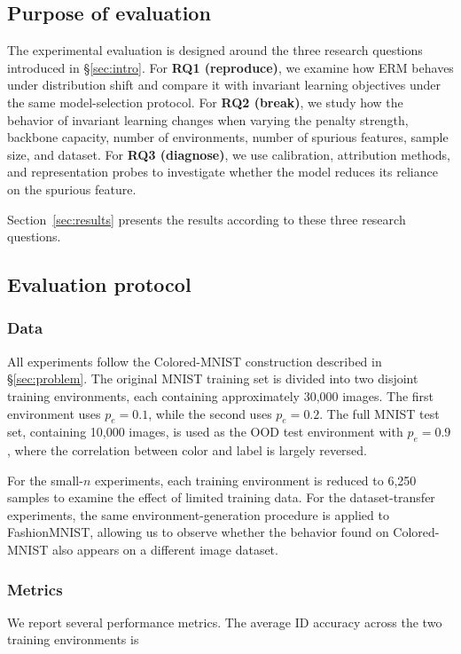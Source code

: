 \documentclass[12pt,a4paper]{article}
\begin{document}
\subsection{Purpose of evaluation}\label{subsec:purpose}

The experimental evaluation is designed around the three research questions introduced
in \S\ref{sec:intro}. For \textbf{RQ1 (reproduce)}, we examine how ERM behaves under
distribution shift and compare it with invariant learning objectives under the same
model-selection protocol. For \textbf{RQ2 (break)}, we study how the behavior of
invariant learning changes when varying the penalty strength, backbone capacity, number
of environments, number of spurious features, sample size, and dataset. For
\textbf{RQ3 (diagnose)}, we use calibration, attribution methods, and representation
probes to investigate whether the model reduces its reliance on the spurious feature.

Section~\ref{sec:results} presents the results according to these three research questions.

\subsection{Evaluation protocol}
\label{subsec:protocol}

\subsubsection{Data}
All experiments follow the Colored-MNIST construction described in
\S\ref{sec:problem}. The original MNIST training set is divided into two disjoint
training environments, each containing approximately 30,000 images. The first
environment uses $p_e=0.1$, while the second uses $p_e=0.2$. The full MNIST test set,
containing 10,000 images, is used as the OOD test environment with $p_e=0.9$, where
the correlation between color and label is largely reversed.

For the small-$n$ experiments, each training environment is reduced to 6,250 samples
to examine the effect of limited training data. For the dataset-transfer experiments,
the same environment-generation procedure is applied to FashionMNIST, allowing us to
observe whether the behavior found on Colored-MNIST also appears on a different image
dataset.

\subsubsection{Metrics}
We report several performance metrics. The average ID accuracy across the two
training environments is
\end{document}
